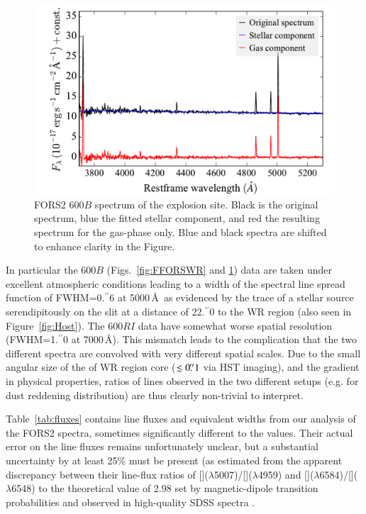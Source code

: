 \documentclass[traditabstract]{aa}
\newcommand{\farc}{\hbox{$.\!\!^{\prime\prime}$}}
\newcommand{\oiii}{[\ion{O}{iii}]}
\newcommand{\nii}{[\ion{N}{ii}]}
\begin{document}
\begin{appendix}
\begin{figure}
\includegraphics[angle=0, width=0.9\columnwidth]{Figs/FORS2_3700_5300_starlight.pdf}
\caption{FORS2 600$B$ spectrum of the explosion site. Black is the original spectrum, blue the fitted stellar component, and red the resulting spectrum for the gas-phase only. Blue and black spectra are shifted to enhance clarity in the Figure.}
\label{fig:FORSSN}
\end{figure}

In particular the 600$B$ (Figs.~\ref{fig:FFORSWR} and \ref{fig:FORSSN}) data are taken under excellent atmospheric conditions leading to a width of the spectral line spread function of FWHM=0\farc{6} at 5000\,\AA\, as evidenced by the trace of a stellar source serendipitously on the slit at a distance of 22\farc{0} to the WR region (also seen in Figure~\ref{fig:Host}). The 600$RI$ data have somewhat worse spatial resolution (FWHM=1\farc{0} at 7000\,\AA). This mismatch leads to the complication that the two different spectra are convolved with very different spatial scales. Due to the small angular size of the of WR region core ($\lesssim 0\farc{1}$ via HST imaging), and the gradient in physical properties, ratios of lines observed in the two different setups (e.g. for dust reddening distribution) are thus clearly non-trivial to interpret.

Table~\ref{tab:fluxes} contains line fluxes and equivalent widths from our analysis of the FORS2 spectra, sometimes significantly different to the \citet{2006A&A...454..103H} values. Their actual error on the line fluxes remains unfortunately unclear, but a substantial uncertainty by at least 25\% must be present (as estimated from the apparent discrepancy between their line-flux ratios of \oiii($\lambda$5007)/\oiii($\lambda$4959) and \nii($\lambda$6584)/\nii($\lambda$6548) to the theoretical value of 2.98 set by magnetic-dipole transition probabilities and observed in high-quality SDSS spectra \citep[e.g.][]{2000MNRAS.312..813S, 2006agna.book.....O, 2016MNRAS.459.3475W}.


\end{appendix}
\end{document}
